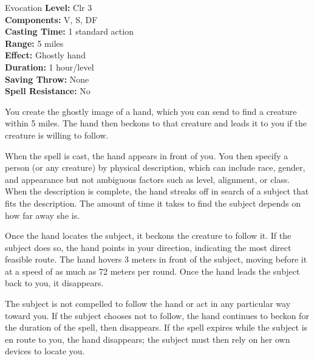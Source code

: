 {Evocation}
{
	\textbf{Level:}
	Clr 3\\
	\textbf{Components:}
	V, S, DF\\
	\textbf{Casting Time:}
	1 standard action\\
	\textbf{Range:}
	5 miles\\
	\textbf{Effect:}
	Ghostly hand\\
	\textbf{Duration:}
	1 hour/level\\
	\textbf{Saving Throw:}
	None\\
	\textbf{Spell Resistance:}
	No\\
}
{
	You create the ghostly image of a hand, which you can send to find a creature within 5 miles. The hand then beckons to that creature and leads it to you if the creature is willing to follow.


	When the spell is cast, the hand appears in front of you. You then specify a person (or any creature) by physical description, which can include race, gender, and appearance but not ambiguous factors such as level, alignment, or class. When the description is complete, the hand streaks off in search of a subject that fits the description. The amount of time it takes to find the subject depends on how far away she is.

	Once the hand locates the subject, it beckons the creature to follow it. If the subject does so, the hand points in your direction, indicating the most direct feasible route. The hand hovers 3 meters in front of the subject, moving before it at a speed of as much as 72 meters per round. Once the hand leads the subject back to you, it disappears.

	The subject is not compelled to follow the hand or act in any particular way toward you. If the subject chooses not to follow, the hand continues to beckon for the duration of the spell, then disappears. If the spell expires while the subject is en route to you, the hand disappears; the subject must then rely on her own devices to locate you.

}
